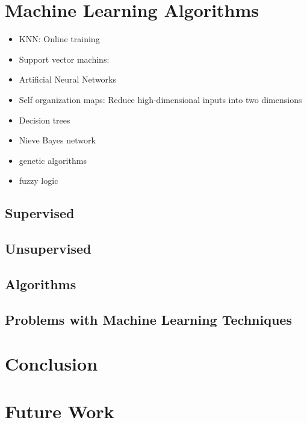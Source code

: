 \documentclass[12pt]{article} %
\begin{document}
\section{Machine Learning Algorithms}


\begin{itemize}
    \item KNN: Online training
    \item Support vector machins:  
    \item Artificial Neural Networks
    \item Self organization maps: Reduce high-dimensional inputs into two dimensions
    \item Decision trees
    \item Nieve Bayes network
    \item genetic algorithms
    \item fuzzy logic
\end{itemize}


\subsection{Supervised}
\subsection{Unsupervised}
\subsection{Algorithms}
\subsection{Problems with Machine Learning Techniques}


\section{Conclusion} 
\section{Future Work}
\end{document}

